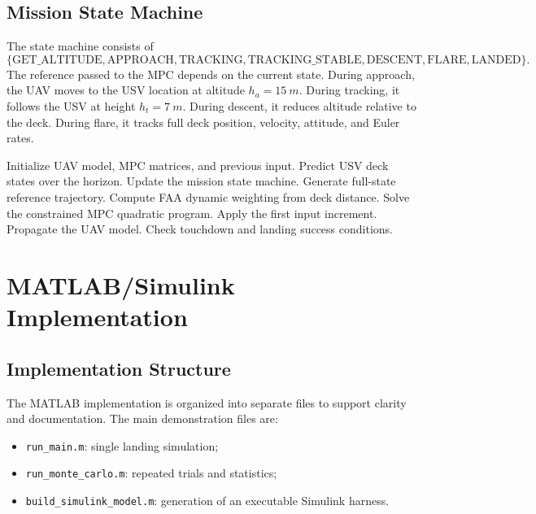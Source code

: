 \documentclass[12pt,a4paper]{report}
\begin{document}
\section{Mission State Machine}
The state machine consists of
\begin{equation}
\{\mathrm{GET\_ALTITUDE},\mathrm{APPROACH},\mathrm{TRACKING},
\mathrm{TRACKING\_STABLE},\mathrm{DESCENT},\mathrm{FLARE},\mathrm{LANDED}\}.
\end{equation}
The reference passed to the MPC depends on the current state. During approach, the UAV moves to the USV location at altitude $h_a=\SI{15}{m}$. During tracking, it follows the USV at height $h_t=\SI{7}{m}$. During descent, it reduces altitude relative to the deck. During flare, it tracks full deck position, velocity, attitude, and Euler rates.

\begin{algorithm}[H]
\caption{MPC-FAA landing procedure}
\begin{algorithmic}[1]
\State Initialize UAV model, MPC matrices, and previous input.
    \State Predict USV deck states over the horizon.
    \State Update the mission state machine.
    \State Generate full-state reference trajectory.
    \State Compute FAA dynamic weighting from deck distance.
    \State Solve the constrained MPC quadratic program.
    \State Apply the first input increment.
    \State Propagate the UAV model.
    \State Check touchdown and landing success conditions.
\EndFor
\end{algorithmic}
\end{algorithm}

\chapter{MATLAB/Simulink Implementation}

\section{Implementation Structure}
The MATLAB implementation is organized into separate files to support clarity and documentation. The main demonstration files are:
\begin{itemize}
    \item \texttt{run\_main.m}: single landing simulation;
    \item \texttt{run\_monte\_carlo.m}: repeated trials and statistics;
    \item \texttt{build\_simulink\_model.m}: generation of an executable Simulink harness.
\end{itemize}
\end{document}
